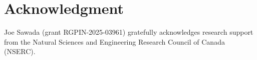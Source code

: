 \documentclass[US-letter,USenglish,authorcolumns,autoref]{lipics-v2021}
\begin{document}

\section{Acknowledgment}
Joe Sawada (grant RGPIN-2025-03961) gratefully acknowledges research support from the Natural Sciences and Engineering Research Council of Canada (NSERC).

\end{document}
